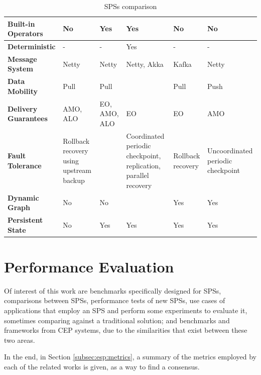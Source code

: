 \documentclass[ppgc,diss,english]{iiufrgs}
\begin{document}
\begin{table}[t]
\begin{center}
\begin{tabular}{ | p{2.5cm} | p{2cm} | p{2.5cm} | p{2.5cm} | p{2cm} | p{2cm} |}
        \textbf{Built-in Operators}      & No & Yes & Yes & No & No \\\hline
        \textbf{Deterministic}           & - & - & Yes & - & - \\\hline
        
        \textbf{Message System}          & Netty & Netty & Netty, Akka & Kafka & Netty \\\hline
        \textbf{Data Mobility}\cite{kamburugamuvesurvey}          & Pull & Pull &  & Pull & Push \\\hline
        \textbf{Delivery Guarantees}\cite{bockermann2014survey}    & AMO, ALO & EO, AMO, ALO & EO & EO & AMO \\\hline
        \textbf{Fault Tolerance}\cite{gradvohl2014comparing}         & Rollback recovery using upstream backup &  & Coordinated periodic checkpoint, replication, parallel recovery & Rollback recovery \cite{kamburugamuvesurvey}  & Uncoordinated periodic checkpoint \\\hline
        \textbf{Dynamic Graph}           & No & No &  & Yes & Yes \\\hline
        \textbf{Persistent State}        & No & Yes & Yes & Yes & Yes \\\hline
        
	\end{tabular}
	\begin{flushleft}
	\end{flushleft}
	\caption{SPSs comparison}
	\label{table:sps_comparison}
\end{center}
\end{table}


\section{Performance Evaluation}
\label{sec:esp:performance_evaluation}

Of interest of this work are benchmarks specifically designed for SPSs, comparisons between SPSs, performance tests of new SPSs, use cases of applications that employ an SPS and perform some experiments to evaluate it, sometimes comparing against a traditional solution; and benchmarks and frameworks from CEP systems, due to the similarities that exist between these two areas.

In the end, in Section \ref{subsec:esp:metrics}, a summary of the metrics employed by each of the related works is given, as a way to find a consensus.
\end{document}
